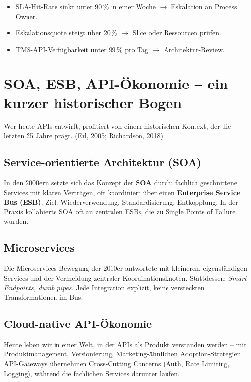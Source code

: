 \documentclass[11pt,a4paper,oneside]{article}
\newcommand{\fachbegriff}[1]{\textbf{#1}}
\newcommand{\quelle}[1]{{\footnotesize\color{lpGray}(#1)}}
\begin{document}
\begin{itemize}
  \item SLA-Hit-Rate sinkt unter 90\,\% in einer Woche $\rightarrow$ Eskalation an Process Owner.
  \item Eskalationsquote steigt über 20\,\% $\rightarrow$ Slice oder Ressourcen prüfen.
  \item TMS-API-Verfügbarkeit unter 99\,\% pro Tag $\rightarrow$ Architektur-Review.
\end{itemize}

\section{SOA, ESB, API-Ökonomie -- ein kurzer historischer Bogen}

Wer heute APIs entwirft, profitiert von einem historischen Kontext, der die letzten 25 Jahre prägt. \quelle{Erl, 2005; Richardson, 2018}

\subsection{Service-orientierte Architektur (SOA)}

In den 2000ern setzte sich das Konzept der \fachbegriff{SOA} durch: fachlich geschnittene Services mit klaren Verträgen, oft koordiniert über einen \fachbegriff{Enterprise Service Bus (ESB)}. Ziel: Wiederverwendung, Standardisierung, Entkopplung. In der Praxis kollabierte SOA oft an zentralen ESBs, die zu Single Points of Failure wurden.

\subsection{Microservices}

Die Microservices-Bewegung der 2010er antwortete mit kleineren, eigenständigen Services und der Vermeidung zentraler Koordinations\-knoten. Stattdessen: \emph{Smart Endpoints, dumb pipes.} Jede Integration explizit, keine versteckten Transformationen im Bus.

\subsection{Cloud-native API-Ökonomie}

Heute leben wir in einer Welt, in der APIs als Produkt verstanden werden -- mit Produktmanagement, Versionierung, Marketing-ähnlichen Adoption-Strategien. API-Gateways übernehmen Cross-Cutting Concerns (Auth, Rate Limiting, Logging), während die fachlichen Services darunter laufen.
\end{document}
